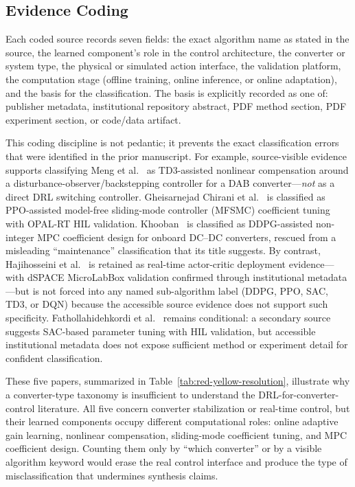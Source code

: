 \documentclass[manuscript,screen,review]{acmart}
\begin{document}
\subsection{Evidence Coding}

Each coded source records seven fields: the exact algorithm name as stated in the source, the learned component's role in the control architecture, the converter or system type, the physical or simulated action interface, the validation platform, the computation stage (offline training, online inference, or online adaptation), and the basis for the classification.
The basis is explicitly recorded as one of: publisher metadata, institutional repository abstract, PDF method section, PDF experiment section, or code/data artifact.

This coding discipline is not pedantic; it prevents the exact classification errors that were identified in the prior manuscript.
For example, source-visible evidence supports classifying Meng et al.~\cite{meng2022novel} as TD3-assisted nonlinear compensation around a disturbance-observer/backstepping controller for a DAB converter---\emph{not} as a direct DRL switching controller.
Gheisarnejad Chirani et al.~\cite{gheisarnejad2022reducing} is classified as PPO-assisted model-free sliding-mode controller (MFSMC) coefficient tuning with OPAL-RT HIL validation.
Khooban~\cite{khooban2022smartenance} is classified as DDPG-assisted non-integer MPC coefficient design for onboard DC--DC converters, rescued from a misleading ``maintenance'' classification that its title suggests.
By contrast, Hajihosseini et al.~\cite{hajihosseini2020dc} is retained as real-time actor-critic deployment evidence---with dSPACE MicroLabBox validation confirmed through institutional metadata---but is not forced into any named sub-algorithm label (DDPG, PPO, SAC, TD3, or DQN) because the accessible source evidence does not support such specificity.
Fathollahidehkordi et al.~\cite{fathollahi2023robust} remains conditional: a secondary source suggests SAC-based parameter tuning with HIL validation, but accessible institutional metadata does not expose sufficient method or experiment detail for confident classification.

These five papers, summarized in Table~\ref{tab:red-yellow-resolution}, illustrate why a converter-type taxonomy is insufficient to understand the DRL-for-converter-control literature.
All five concern converter stabilization or real-time control, but their learned components occupy different computational roles: online adaptive gain learning, nonlinear compensation, sliding-mode coefficient tuning, and MPC coefficient design.
Counting them only by ``which converter'' or by a visible algorithm keyword would erase the real control interface and produce the type of misclassification that undermines synthesis claims.
\end{document}
